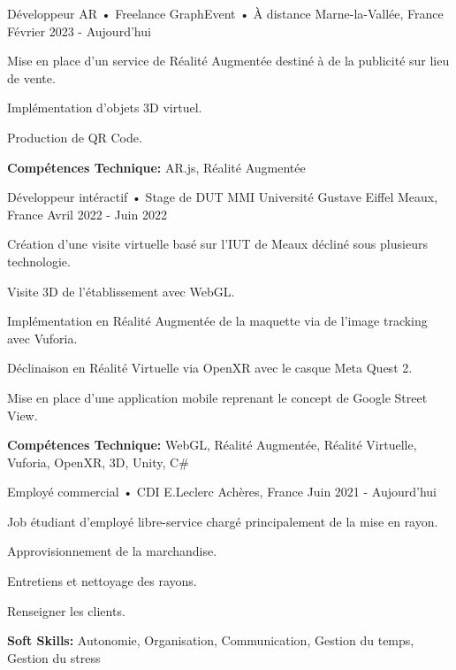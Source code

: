\begin{cventries}
    \cventry
    {Développeur AR • Freelance} %
    {GraphEvent • À distance} %
    {Marne-la-Vallée, France} %
    {Février 2023 - Aujourd'hui} %
    {
      \begin{cvitems} %
        \item {Mise en place d'un service de Réalité Augmentée destiné à de la publicité sur lieu de vente.}
        \item {Implémentation d'objets 3D virtuel.}
        \item{Production de QR Code.}
        \item {\textbf{Compétences Technique:} AR.js, Réalité Augmentée}
      \end{cvitems}
    }
    \cventry
    {Développeur intéractif • Stage de DUT MMI} %
    {Université Gustave Eiffel} %
    {Meaux, France} %
    {Avril 2022 - Juin 2022} %
    {
      \begin{cvitems} %
        \item {Création d'une visite virtuelle basé sur l'IUT de Meaux décliné sous plusieurs technologie.}
        \item {Visite 3D de l'établissement avec WebGL.}
        \item {Implémentation en Réalité Augmentée de la maquette via de l'image tracking avec Vuforia.}
        \item {Déclinaison en Réalité Virtuelle via OpenXR avec le casque Meta Quest 2.}
        \item {Mise en place d'une application mobile reprenant le concept de Google Street View.}
        \item {\textbf{Compétences Technique:} WebGL, Réalité Augmentée, Réalité Virtuelle, Vuforia, OpenXR, 3D, Unity, C\#}
      \end{cvitems}
    }
    \cventry
    {Employé commercial • CDI} %
    {E.Leclerc} %
    {Achères, France} %
    {Juin 2021 - Aujourd'hui} %
    {
      \begin{cvitems} %
        \item {Job étudiant d'employé libre-service chargé principalement de la mise en rayon.}
        \item{Approvisionnement de la marchandise.}
        \item {Entretiens et nettoyage des rayons.}
        \item {Renseigner les clients.}
        \item {\textbf{Soft Skills:} Autonomie, Organisation, Communication, Gestion du temps, Gestion du stress} \\\\
      \end{cvitems}
    }

\end{cventries}

